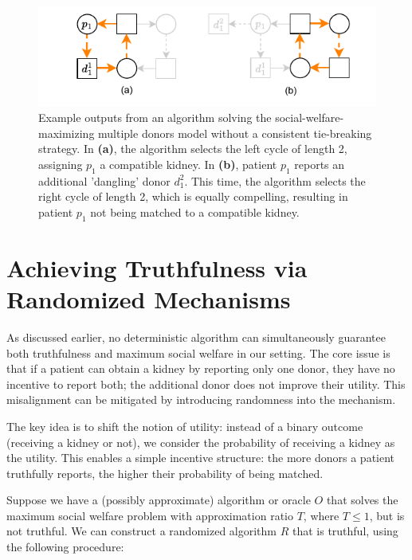 \begin{figure}
    \centering
    \includegraphics{data/weak_truthfulness.pdf}
    \caption[An example output of an algorithm without a consistent tie-breaking strategy.]{Example outputs from an algorithm solving the social-welfare-maximizing multiple donors model without a consistent tie-breaking strategy. In \textbf{(a)}, the algorithm selects the left cycle of length 2, assigning $p_1$ a compatible kidney. In \textbf{(b)}, patient $p_1$ reports an additional 'dangling' donor $d_1^2$. This time, the algorithm selects the right cycle of length 2, which is equally compelling, resulting in patient $p_1$ not being matched to a compatible kidney.}
    \label{fig:weak_truthfulness}
\end{figure}


\section{Achieving Truthfulness via Randomized Mechanisms}

As discussed earlier, no deterministic algorithm can simultaneously guarantee both truthfulness and maximum social welfare in our setting. The core issue is that if a patient can obtain a kidney by reporting only one donor, they have no incentive to report both; the additional donor does not improve their utility. This misalignment can be mitigated by introducing randomness into the mechanism.

The key idea is to shift the notion of utility: instead of a binary outcome (receiving a kidney or not), we consider the probability of receiving a kidney as the utility. This enables a simple incentive structure: the more donors a patient truthfully reports, the higher their probability of being matched.

Suppose we have a (possibly approximate) algorithm or oracle $O$ that solves the maximum social welfare problem with approximation ratio $T$, where $T \leq 1$, but is not truthful. We can construct a randomized algorithm $R$ that is truthful, using the following procedure:


